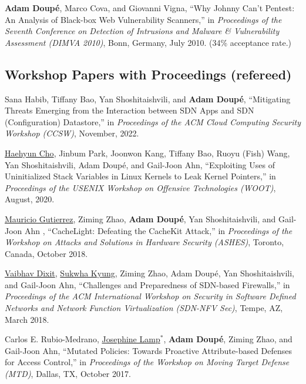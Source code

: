 \documentclass[11pt,letterpaper,sans]{moderncv}
\begin{document}
\begin{etaremune}
\item \textbf{Adam Doup\'e}, Marco Cova, and Giovanni Vigna, ``Why
  Johnny Can't Pentest: An Analysis of Black-box Web Vulnerability
  Scanners,'' in \emph{Proceedings of the Seventh Conference on
    Detection of Intrusions and Malware \& Vulnerability Assessment
    (DIMVA 2010)}, Bonn, Germany, July 2010. (34\% acceptance rate.)

\end{etaremune}

\subsection{Workshop Papers with Proceedings (refereed)}

\begin{etaremune}

\item Sana Habib,  Tiffany Bao,  Yan Shoshitaishvili, and  \textbf{Adam Doup\'e}, ``Mitigating Threats Emerging from the Interaction between SDN Apps and SDN (Configuration) Datastore,'' in \emph{Proceedings of the ACM Cloud Computing Security Workshop (CCSW)}, November, 2022.

\item \underline{Haehyun Cho}, Jinbum Park, Joonwon Kang, Tiffany Bao, Ruoyu (Fish) Wang, Yan Shoshitaishvili, Adam Doup\'e, and Gail-Joon Ahn, ``Exploiting Uses of Uninitialized Stack Variables in Linux Kernels to Leak Kernel Pointers,'' in \emph{Proceedings of the USENIX Workshop on Offensive Technologies (WOOT)}, August, 2020.

\item \underline{Mauricio Gutierrez}, Ziming Zhao, \textbf{Adam Doup\'e}, Yan Shoshitaishvili, and Gail-Joon Ahn , ``CacheLight: Defeating the CacheKit Attack,'' in \emph{Proceedings of the Workshop on Attacks and Solutions in Hardware Security (ASHES)}, Toronto, Canada, October 2018.

\item \underline{Vaibhav Dixit}, \underline{Sukwha Kyung}, Ziming
  Zhao, Adam Doupé, Yan Shoshitaishvili, and Gail-Joon Ahn,
  ``Challenges and Preparedness of SDN-based Firewalls,'' in
  \emph{Proceedings of the ACM International Workshop on Security in
    Software Defined Networks and Network Function Virtualization
    (SDN-NFV Sec)}, Tempe, AZ, March 2018.

\item Carlos E. Rubio-Medrano, \underline{Josephine Lamp}$^*$, \textbf{Adam
  Doup\'e}, Ziming Zhao, and Gail-Joon Ahn, ``Mutated Policies: Towards
  Proactive Attribute-based Defenses for Access Control,'' in
  \emph{Proceedings of the Workshop on Moving Target Defense (MTD)},
  Dallas, TX, October 2017.


\end{etaremune}
\end{document}
